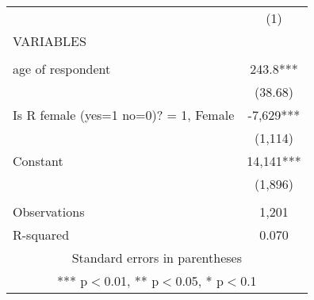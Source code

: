 \begin{tabular}{lc} \hline
 & (1) \\
VARIABLES &  \\ \hline
 &  \\
age of respondent & 243.8*** \\
 & (38.68) \\
Is R female (yes=1 no=0)? = 1, Female & -7,629*** \\
 & (1,114) \\
Constant & 14,141*** \\
 & (1,896) \\
 &  \\
Observations & 1,201 \\
 R-squared & 0.070 \\ \hline
\multicolumn{2}{c}{ Standard errors in parentheses} \\
\multicolumn{2}{c}{ *** p$<$0.01, ** p$<$0.05, * p$<$0.1} \\
\end{tabular}
